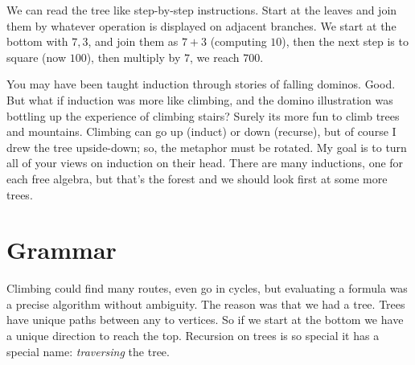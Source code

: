 We can read the tree like step-by-step instructions.  Start at the leaves and join
them by whatever operation is displayed on adjacent branches.
We start at the bottom with $7,3$, and join them as $7+3$ (computing $10$),
then the next step is to square (now $100$), then multiply by $7$, we reach $700$.

You may have been taught induction through stories of falling 
dominos.  Good.  But what if induction was more like climbing, 
and the domino illustration was bottling up the experience
of climbing stairs?  Surely its more fun to climb trees and mountains.
Climbing can go up (induct) or down (recurse), but of course I drew the 
tree upside-down; so, the metaphor must be rotated.
My goal is to turn all of your views on induction on their head.
There are many inductions, one for each free algebra, but that's the forest 
and we should look first at some more trees.

\section{Grammar}
Climbing could find many routes, even go in cycles, but 
evaluating a formula was a precise algorithm without ambiguity.
The reason was that we had a tree.  Trees have unique paths between 
any to vertices. So if we start at the bottom we have a unique direction to 
reach the top.  Recursion on trees is so special it has a special name:
\emph{traversing} the tree.  

